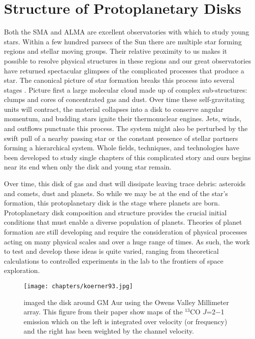 \section{Structure of Protoplanetary Disks}

Both the SMA and ALMA are excellent observatories with which to study young stars.  Within a few hundred parsecs 
of the Sun there are multiple star forming regions and stellar moving groups.  Their relative proximity to us 
makes it possible to resolve physical structures in these regions and our great observatories have returned 
spectacular glimpses of the complicated processes that produce a star.  The canonical picture of star formation 
breaks this process into several stages \citep{shu87,mckee07}.  Picture first a large 
molecular cloud made up of complex sub-structures: clumps and cores of 
concentrated gas and dust.  Over time these self-gravitating units will contract,  the material collapses into 
a disk to conserve angular momentum, and budding stars ignite their thermonuclear engines.  Jets, winds, and 
outflows punctuate this process.  The system might also be perturbed by the swift pull of a nearby passing star 
or the constant presence of stellar partners forming a hierarchical system.  Whole fields, techniques, and 
technologies have been developed to study single chapters of this 
complicated story and ours begins near its end when only the disk and young star remain.

Over time, this disk of gas and dust will dissipate leaving trace debris: asteroids and comets, dust and planets.
So while we may be at the end of the star's formation, this protoplanetary disk is the stage where planets are
born.  Protoplanetary disk composition and structure provides the crucial initial conditions that must 
enable a diverse 
population of planets.  Theories of planet formation are still developing and require the consideration 
of physical processes acting on many physical scales and over a huge range of times.  As such, the
work to test and develop these ideas is quite varied, ranging from theoretical calculations to controlled 
experiments in the lab to the frontiers of space exploration.

\begin{figure}[t]
\vspace{4cm}
\texttt{[image: chapters/koerner93.jpg]}
\caption{\citet{koerner93} imaged the disk around GM Aur using the Owens Valley Millimeter array. This figure
from their paper 
show maps of the $^{13}$CO $J$=2$-$1 emission which on the left is integrated over velocity (or frequency) and 
the right has been weighted by the channel velocity.}
\end{figure}

